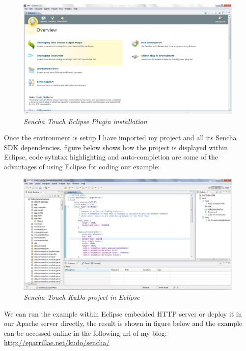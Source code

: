 \documentclass[a4paper,12pt]{book}
\begin{document}
\begin{figure}[H]
    \centering
    \includegraphics[width=12cm, keepaspectratio]{img/sencha2.png}
    \caption{\textit{Sencha Touch Eclipse Plugin installation}}
 \end{figure}

Once the environment is setup I have imported my project and all its Sencha SDK dependencies, figure below shows how the project is displayed within Eclipse, code sytntax highlighting and auto-completion are some of the advantages of using Eclipse for coding our example:

\begin{figure}[H]
    \centering
    \includegraphics[width=12cm, keepaspectratio]{img/sencha3.png}
    \caption{\textit{Sencha Touch KuDo project in Eclipse}}
 \end{figure}
 
We can run the example within Eclipse embedded HTTP server or deploy it in our Apache server directly, the result is shown in figure below and the example can be accessed online in the following url of my blog:\\ 

\url{http://eparrillae.net/kudo/sencha/}
\end{document}
